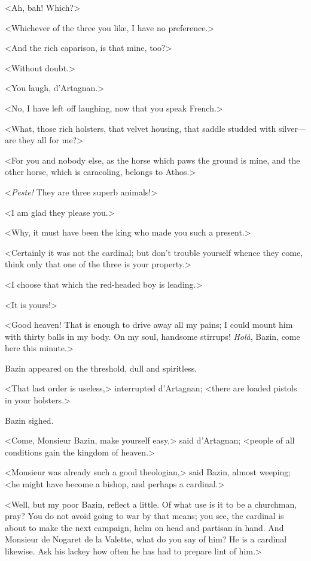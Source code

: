 <Ah, bah! Which?> 

<Whichever of the three you like, I have no preference.> 

<And the rich caparison, is that mine, too?> 

<Without doubt.> 

<You laugh, d'Artagnan.> 

<No, I have left off laughing, now that you speak French.> 

<What, those rich holsters, that velvet housing, that saddle studded with silver---are they all for me?> 

<For you and nobody else, as the horse which paws the ground is mine, and the other horse, which is caracoling, belongs to Athos.> 

<\textit{Peste!} They are three superb animals!> 

<I am glad they please you.> 

<Why, it must have been the king who made you such a present.> 

<Certainly it was not the cardinal; but don't trouble yourself whence they come, think only that one of the three is your property.> 

<I choose that which the red-headed boy is leading.> 

<It is yours!> 

<Good heaven! That is enough to drive away all my pains; I could mount him with thirty balls in my body. On my soul, handsome stirrups! \textit{Holà}, Bazin, come here this minute.> 

Bazin appeared on the threshold, dull and spiritless. 

<That last order is useless,> interrupted d'Artagnan; <there are loaded pistols in your holsters.> 

Bazin sighed. 

<Come, Monsieur Bazin, make yourself easy,> said d'Artagnan; <people of all conditions gain the kingdom of heaven.> 

<Monsieur was already such a good theologian,> said Bazin, almost weeping; <he might have become a bishop, and perhaps a cardinal.> 

<Well, but my poor Bazin, reflect a little. Of what use is it to be a churchman, pray? You do not avoid going to war by that means; you see, the cardinal is about to make the next campaign, helm on head and partisan in hand. And Monsieur de Nogaret de la Valette, what do you say of him? He is a cardinal likewise. Ask his lackey how often he has had to prepare lint of him.> 

